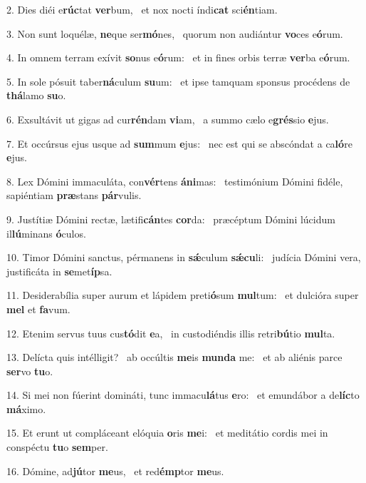 2. Dies diéi e\textbf{rúc}tat \textbf{ver}bum, \ast\  et nox nocti índi\textbf{cat} sci\textbf{én}tiam.\

3. Non sunt loquélæ, \textbf{ne}que ser\textbf{mó}nes, \ast\  quorum non audiántur \textbf{vo}ces e\textbf{ó}rum.\

4. In omnem terram exívit \textbf{so}nus e\textbf{ó}rum: \ast\  et in fines orbis terræ \textbf{ver}ba e\textbf{ó}rum.\

5. In sole pósuit taber\textbf{ná}culum \textbf{su}um: \ast\  et ipse tamquam sponsus procédens de \textbf{thá}lamo \textbf{su}o.\

6. Exsultávit ut gigas ad cur\textbf{rén}dam \textbf{vi}am, \ast\  a summo cælo e\textbf{grés}sio \textbf{e}jus.\

7. Et occúrsus ejus usque ad \textbf{sum}mum \textbf{e}jus: \ast\  nec est qui se abscóndat a ca\textbf{ló}re \textbf{e}jus.\

8. Lex Dómini immaculáta, con\textbf{vér}tens \textbf{á}\textbf{ni}mas: \ast\  testimónium Dómini fidéle, sapiéntiam \textbf{præ}stans \textbf{pár}vulis.\

9. Justítiæ Dómini rectæ, lætifi\textbf{cán}tes \textbf{cor}da: \ast\  præcéptum Dómini lúcidum il\textbf{lú}minans \textbf{ó}culos.\

10. Timor Dómini sanctus, pérmanens in \textbf{sǽ}culum \textbf{sǽ}\textbf{cu}li: \ast\  judícia Dómini vera, justificáta in \textbf{se}met\textbf{íp}sa.\

11. Desiderabília super aurum et lápidem preti\textbf{ó}sum \textbf{mul}tum: \ast\  et dulcióra super \textbf{mel} et \textbf{fa}vum.\

12. Etenim servus tuus cus\textbf{tó}dit \textbf{e}a, \ast\  in custodiéndis illis retri\textbf{bú}tio \textbf{mul}ta.\

13. Delícta quis intélligit? \dag\  ab occúltis \textbf{me}is \textbf{mun}\textbf{da} me: \ast\  et ab aliénis parce \textbf{ser}vo \textbf{tu}o.\

14. Si mei non fúerint domináti, tunc immacu\textbf{lá}tus \textbf{e}ro: \ast\  et emundábor a de\textbf{líc}to \textbf{má}ximo.\

15. Et erunt ut compláceant elóquia \textbf{o}ris \textbf{me}i: \ast\  et meditátio cordis mei in conspéctu \textbf{tu}o \textbf{sem}per.\

16. Dómine, ad\textbf{jú}tor \textbf{me}us, \ast\  et red\textbf{émp}tor \textbf{me}us.\

